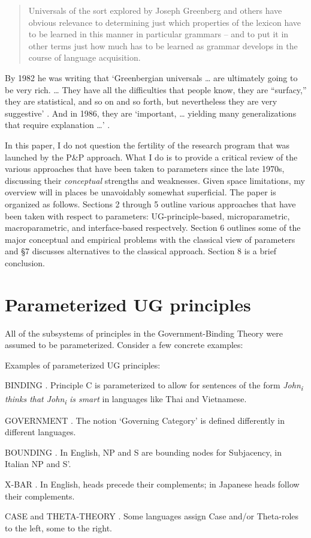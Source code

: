 \documentclass[output=paper,
modfonts
]{LSP/langsci}
\begin{document}
\begin{quote}
Universals of the sort explored by Joseph Greenberg and others have
obvious relevance to determining just which properties of the lexicon
have to be learned in this manner in particular grammars  --  and to put
it in other terms just how much has to be learned as grammar develops in
the course of language acquisition. \citep[95]{chomsky1981}
\end{quote}

By 1982 he was writing that `Greenbergian universals {\ldots} are ultimately
going to be very rich. {\ldots} They have all the difficulties that people
know, they are ``surfacy,'' they are statistical, and so on and so
forth, but nevertheless they are very suggestive' \citep[111]{chomsky1982}.
And in 1986, they are `important, {\ldots} yielding many generalizations that
require explanation {\ldots}' \citep[21]{chomsky1986}.

In this paper, I do not question the fertility of the research program
that was launched by the P\&P approach. What I do is to provide a
critical review of the various approaches that have been taken to
parameters since the late 1970s, discussing their \emph{conceptual}
strengths and weaknesses. Given space limitations, my overview will in
places be unavoidably somewhat superficial. The paper is organized as
follows. Sections 2 through 5 outline various approaches that have been
taken with respect to parameters: UG-principle-based, microparametric,
macroparametric, and interface-based respectvely. Section 6 outlines
some of the major conceptual and empirical problems with the classical
view of parameters and §7 discusses alternatives to the classical
approach. Section 8 is a brief conclusion.

\section{Parameterized UG principles}

All of the subsystems of principles in the Government-Binding Theory
were assumed to be parameterized. Consider a few concrete examples:

\begin{exe}
\ex Examples of parameterized UG principles:
\begin{xlist}
\ex  BINDING \citep{lasnik1991}. Principle C is parameterized to allow for
sentences of the form \emph{John\textsubscript{i} thinks that
John\textsubscript{i} is smart} in languages like Thai and Vietnamese.

\ex GOVERNMENT \citep{manzini1987}. The notion `Governing Category'
is defined differently in different languages.

\ex BOUNDING \citep{rizzi1982}. In English, NP and S are bounding nodes for
Subjacency, in Italian NP and S'.

\ex X-BAR \citep{stowell1981}. In English, heads precede their complements; in
Japanese heads follow their complements.

\ex CASE and THETA-THEORY \citep{travis1989}. Some languages assign Case
and/or Theta-roles to the left, some to the right.
\end{xlist}
\end{exe}
\end{document}
